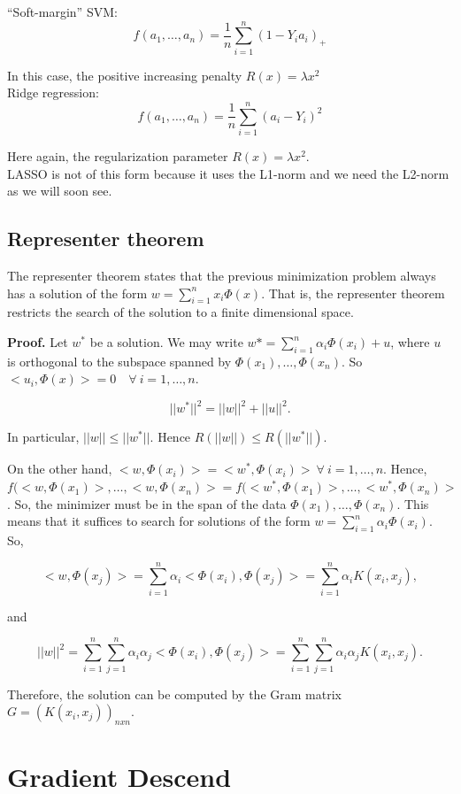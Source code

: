 \documentclass[11pt, english]{article}
\begin{document}
``Soft-margin'' SVM:
$$
f(a_1,\dots,a_n) = \frac{1}{n} \sum_{i=1}^{n}(1 - Y_ia_i)_+
$$

In this case, the positive increasing penalty $R(x) = \lambda x^2$\\

Ridge regression:
$$
f(a_1, \dots, a_n) = \frac{1}{n} \sum_{i=1}^{n}(a_i - Y_i)^2
$$

Here again, the regularization parameter $R(x) = \lambda x^2$.\\

LASSO is not of this form because it uses the L1-norm and we need the L2-norm as we will soon see.

\subsection{Representer theorem}

The representer theorem states that the previous minimization problem always has a solution of the form $w = \sum_{i=1}^{n} x_i \Phi(x)$. That is, the representer theorem restricts the search of the solution to a finite dimensional space.

\textbf{Proof.} Let $w^*$ be a solution. We may write $w* = \sum_{i=1}^{n}\alpha_i \Phi(x_i) + u$, where $u$ is orthogonal to the subspace spanned by $\Phi(x_1),\dots, \Phi(x_n)$. So $<u_i, \Phi(x)> = 0 \quad \forall \ i=1,\dots,n$.

\begin{equation}
||w^*||^2 = ||w||^2 + ||u||^2.
\end{equation}


In particular, $||w|| \leq ||w^*||$. Hence $R(||w||) \leq R(||w^*||).$

On the other hand, $<w,\Phi(x_i)> = <w^*, \Phi(x_i)> \ \forall \ i = 1,\dots, n$. Hence, $f(<w,\Phi(x_1)>, \dots, <w, \Phi (x_n)> = f(<w^*,\Phi(x_1)>, \dots, <w^*, \Phi (x_n)>$. So, the minimizer must be in the span of the data $\Phi(x_1), \dots, \Phi(x_n)$. This means that it suffices to search for solutions of the form $w = \sum_{i=1}^{n}\alpha_i \Phi(x_i)$. So,

\begin{equation}
<w,\Phi(x_j)> = \sum_{i=1}^{n} \alpha_i <\Phi(x_i), \Phi(x_j)> = \sum_{i=1}^{n}\alpha_i K(x_i, x_j),
\end{equation}

and

\begin{equation}
||w||^2 = \sum_{i=1}^{n} \sum_{j=1}^{n} \alpha_i \alpha_j <\Phi(x_i), \Phi(x_j)> = \sum_{i=1}^{n}\sum_{j=1}^{n} \alpha_i \alpha_j K(x_i, x_j).
\end{equation}

Therefore, the solution can be computed by the Gram matrix $G = (K(x_i,x_j))_{nxn}$.


\section{Gradient Descend}

 
\end{document}
